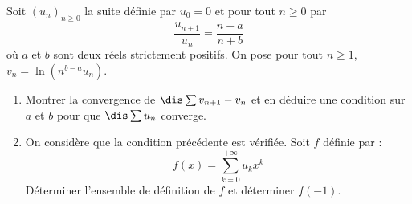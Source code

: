 \documentclass[a4paper,10pt]{report}
\begin{document}
\begin{Exa} Soit $(u_n)_{n \geq 0}$ la suite définie par $u_0=0$ et pour tout $n \geq 0$ par 
$$ \dfrac{u_{n+1}}{u_n} = \dfrac{n+a}{n+b}$$
où $a$ et $b$ sont deux réels strictement positifs. On pose pour tout $n \geq 1$, $v_n = \ln(n^{b-a}u_n)$.
\begin{enumerate}
\item Montrer la convergence de $\dis \sum v_{n+1}- v_n$ et en déduire une condition sur $a$ et $b$ pour que $\dis \sum u_n$ converge.
\item On considère que la condition précédente est vérifiée. Soit $f$ définie par :
$$ f(x) = \sum_{k=0}^{+ \infty} u_k x^k$$
Déterminer l'ensemble de définition de $f$ et déterminer $f(-1)$.
\end{enumerate}
\end{Exa}
\end{document}
